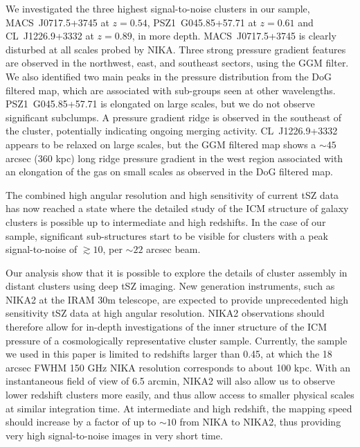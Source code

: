 \documentclass[twocolumn,traditabstract]{aa}
\begin{document}
We investigated the three highest signal-to-noise clusters in our sample, \mbox{MACS~J0717.5+3745} at $z=0.54$, \mbox{PSZ1~G045.85+57.71} at $z=0.61$ and \mbox{CL~J1226.9+3332} at $z=0.89$, in more depth. \mbox{MACS~J0717.5+3745} is clearly disturbed at all scales probed by NIKA. Three strong pressure gradient features are observed in the northwest, east, and southeast sectors, using the GGM filter. We also identified two main peaks in the pressure distribution from the DoG filtered map, which are associated with sub-groups seen at other wavelengths. \mbox{PSZ1~G045.85+57.71} is elongated on large scales, but we do not observe significant subclumps. A pressure gradient ridge is observed in the southeast of the cluster, potentially indicating ongoing merging activity. \mbox{CL~J1226.9+3332} appears to be relaxed on large scales, but the GGM filtered map shows a $\sim 45$ arcsec (360 kpc) long ridge pressure gradient in the west region associated with an elongation of the gas on small scales as observed in the DoG filtered map.

The combined high angular resolution and high sensitivity of current tSZ data has now reached a state where the detailed study of the ICM structure of galaxy clusters is possible up to intermediate and high redshifts. In the case of our sample, significant sub-structures start to be visible for clusters with a peak signal-to-noise of $\gtrsim 10$, per $\sim 22$ arcsec beam.

Our analysis show that it is possible to explore the details of cluster assembly in distant clusters using deep tSZ imaging. New generation instruments, such as NIKA2 \citep{Calvo2016,Catalano2016} at the IRAM 30m telescope, are expected to provide unprecedented high sensitivity tSZ data at high angular resolution. NIKA2 observations \citep[such as the ones of the tSZ large program,][]{Comis2016} should therefore allow for in-depth investigations of the inner structure of the ICM pressure of a cosmologically representative cluster sample. Currently, the sample we used in this paper is limited to redshifts larger than 0.45, at which the 18 arcsec FWHM 150 GHz NIKA resolution corresponds to about 100 kpc. With an instantaneous field of view of 6.5 arcmin, NIKA2 will also allow us to observe lower redshift clusters more easily, and thus allow access to smaller physical scales at similar integration time. At intermediate and high redshift, the mapping speed should increase by a factor of up to $\sim 10$ from NIKA to NIKA2, thus providing very high signal-to-noise images in very short time.
\end{document}
